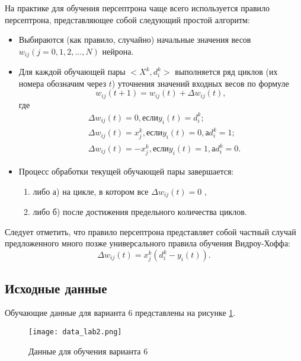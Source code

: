 На практике для обучения персептрона чаще всего используется правило персептрона, представляющее собой следующий простой алгоритм:

\begin{itemize}
\item Выбираются (как правило, случайно) начальные значения весов $w_{ij} (j=0, 1, 2, ..., N)$ нейрона.

\item Для каждой обучающей пары $<X^k, d^k_i>$ выполняется ряд циклов (их номера обозначим через $t$) уточнения значений входных весов по формуле
\begin{equation}
  w_{ij}(t+1) = w_{ij}(t) + \Delta w_{ij}(t),
\end{equation}
где
\begin{equation}\label{eq:system}
	\begin{aligned}
	& \Delta w_{ij}(t)=0, если y_i(t)=d^k_i; \\
	& \Delta w_{ij}(t)=x^k_j, если y_i(t)=0, а d^k_i=1; \\
	& \Delta w_{ij}(t)=-x^k_j, если y_i(t)=1, а d^k_i=0. 
	\end{aligned}  		
\end{equation}

\item Процесс обработки текущей обучающей пары завершается:
	\begin{enumerate}
	\item[] либо а) на цикле, в котором все $\Delta w_{ij}(t)=0$ ,
	\item[] либо б) после достижения предельного количества циклов.
	\end{enumerate}
\end{itemize}

Следует отметить, что правило персептрона представляет собой частный случай предложенного много позже универсального правила обучения Видроу-Хоффа:
\begin{equation}\label{eq:vidHoff}
  \Delta w_{ij}(t)=x^k_j(d^k_i-y_i(t)).
\end{equation}

\subsection{Исходные данные}

Обучающие данные для варианта 6 представлены на рисунке \ref{img:data_lab2}.

\begin{figure}[H]
\centering
\texttt{[image: data\_lab2.png]}
\caption{Данные для обучения варианта 6}
\label{img:data_lab2}
\end{figure}


